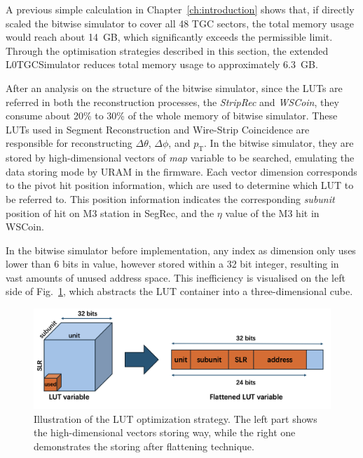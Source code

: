 A previous simple calculation in Chapter~\ref{ch:introduction} shows that, if directly scaled the bitwise simulator to cover all 48 TGC sectors, the total memory usage would reach about 14~GB, which significantly exceeds the permissible limit. Through the optimisation strategies described in this section, the extended L0TGCSimulator reduces total memory usage to approximately 6.3~GB.

After an analysis on the structure of the bitwise simulator, since the LUTs are referred in both the reconstruction processes, the \textit{StripRec} and \textit{WSCoin}, they consume about 20\% to 30\% of the whole memory of bitwise simulator. These LUTs used in Segment Reconstruction and Wire-Strip Coincidence are responsible for reconstructing $\Delta\theta$, $\Delta\phi$, and $p_{\mathrm{T}}$. In the bitwise simulator, they are stored by high-dimensional vectors of \textit{map} variable to be searched, emulating the data storing mode by URAM in the firmware. Each vector dimension corresponds to the pivot hit position information, which are used to determine which LUT to be referred to. This position information indicates the corresponding \textit{subunit} position of hit on M3 station in SegRec, and the $\eta$ value of the M3 hit in WSCoin. 

In the bitwise simulator before implementation, any index as dimension only uses lower than 6 bits in value, however stored within a 32 bit integer, resulting in vast amounts of unused address space. This inefficiency is visualised on the left side of Fig.~\ref{fig:LUT_optimization}, which abstracts the LUT container into a three-dimensional cube.
\begin{figure}[htbp]
  \centering
  \includegraphics[width=1.0\textwidth]{figs/chapter5/LUT_optimization.png}
  \caption{Illustration of the LUT optimization strategy. The left part shows the high-dimensional vectors storing way, while the right one demonstrates the storing after flattening technique.}
  \label{fig:LUT_optimization}
\end{figure}

